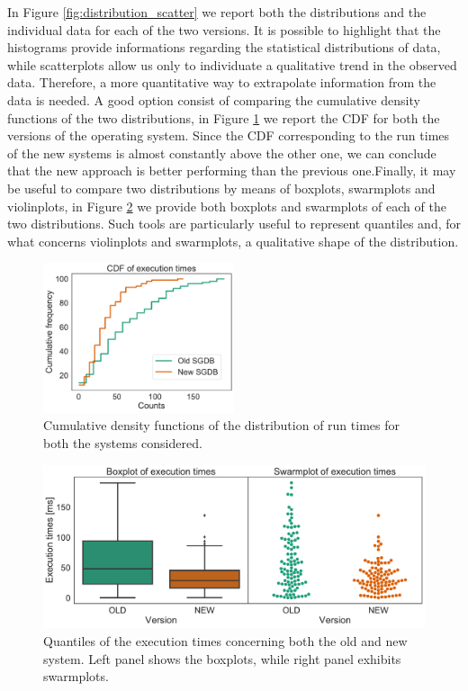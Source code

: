 \documentclass[twoside,onecolumn]{article}
\theoremstyle{definition}
\begin{document}
 \par
In Figure \ref{fig:distribution_scatter} we report both the distributions and the individual data for each of the two versions. It is possible to highlight that the histograms provide informations regarding the statistical distributions of data, while scatterplots allow us only to individuate a qualitative trend in the observed data. Therefore, a more quantitative way to extrapolate information from the data is needed. A good option consist of comparing the cumulative density functions of the two distributions, in Figure \ref{fig:cdf} we report the CDF for both the versions of the operating system. Since the CDF corresponding to the run times of the new systems is almost constantly above the other one, we can conclude that the new approach is better performing than the previous one.Finally, it may be useful to compare two distributions by means of boxplots, swarmplots and violinplots, in Figure \ref{fig:boxswarm} we provide both boxplots and swarmplots of each of the two distributions. Such tools are particularly useful to represent quantiles and, for what concerns violinplots and swarmplots, a qualitative shape of the distribution.


\begin{figure}\centering
\includegraphics[width=0.5\textwidth]{../figs/extimes_CDF.pdf}
\caption{Cumulative density functions of the distribution of run times for both the systems considered. }\label{fig:cdf}
\end{figure}

\begin{figure}\centering
\includegraphics[width=0.9
\textwidth]{../figs/extimes_quantiles.pdf}
\caption{Quantiles of the execution times concerning both the old and new system. Left panel shows the boxplots, while right panel exhibits swarmplots.}\label{fig:boxswarm}
\end{figure}
\end{document}
